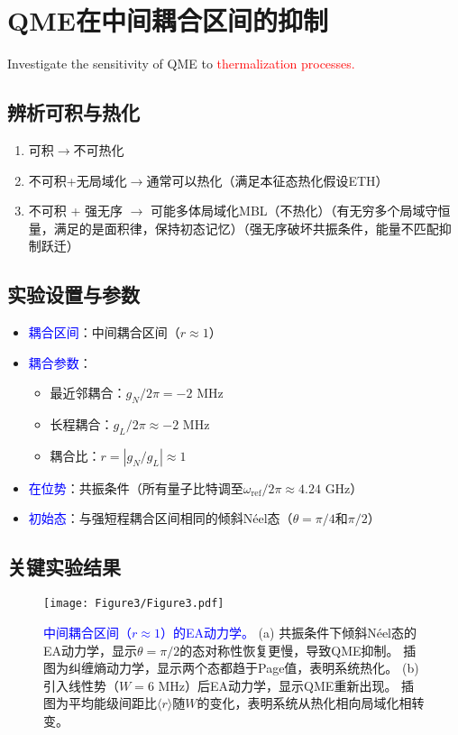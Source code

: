 \documentclass[11pt,a4paper]{article}
\begin{document}
\section{QME在中间耦合区间的抑制}
Investigate the sensitivity of QME to \textcolor{red}{thermalization processes.}

\subsection{辨析可积与热化}
\begin{enumerate}
\item 可积$\rightarrow$不可热化
\item 不可积+无局域化$\rightarrow$通常可以热化（满足本征态热化假设ETH）
\item 不可积 + 强无序 $\rightarrow$ 可能多体局域化MBL（不热化）（有无穷多个局域守恒量，满足的是面积律，保持初态记忆）（强无序破坏共振条件，能量不匹配抑制跃迁）
\end{enumerate}


\subsection{实验设置与参数}
\begin{itemize}
    \item \textcolor{blue}{耦合区间}：中间耦合区间（$r \approx 1$）
    \item \textcolor{blue}{耦合参数}：
    \begin{itemize}
        \item 最近邻耦合：$g_N/2\pi = -2$ MHz
        \item 长程耦合：$g_L/2\pi \approx -2$ MHz
        \item 耦合比：$r = |g_N/g_L| \approx 1$
    \end{itemize}
    \item \textcolor{blue}{在位势}：共振条件（所有量子比特调至$\omega_{\text{ref}}/2\pi \approx 4.24$ GHz）
    \item \textcolor{blue}{初始态}：与强短程耦合区间相同的倾斜Néel态（$\theta = \pi/4$和$\pi/2$）
\end{itemize}

\subsection{关键实验结果}
\begin{figure}[H]
    \centering
    \texttt{[image: Figure3/Figure3.pdf]}
    \caption{
        \textcolor{blue}{中间耦合区间（$r \approx 1$）的EA动力学。}
        (a) 共振条件下倾斜Néel态的EA动力学，显示$\theta = \pi/2$的态对称性恢复更慢，导致QME抑制。
        插图为纠缠熵动力学，显示两个态都趋于Page值，表明系统热化。
        (b) 引入线性势（$W = 6$ MHz）后EA动力学，显示QME重新出现。
        插图为平均能级间距比$\langle r \rangle$随$W$的变化，表明系统从热化相向局域化相转变。
    }
    \label{fig:intermediate_coupling}
\end{figure}
\end{document}
